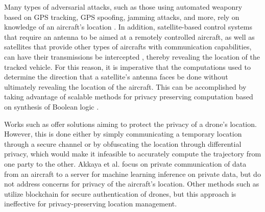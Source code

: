 \documentclass[9pt,sigconf,screen]{acmart}
\newcommand{\yaman}[1]{\textcolor{blue}{{\sf (YJ:} {\sl{#1})}}}
\newcommand{\nasimeh}[1]{\textcolor{purple}{{\sf (NH:} {\sl{#1})}}}
\begin{document}
Many types of adversarial attacks, such as those using automated weaponry based on GPS tracking, GPS spoofing, jamming attacks, and more, rely on knowledge of an aircraft's location \cite{GPSNav}. 
In addition, satellite-based control systems that require an antenna to be aimed at a remotely controlled aircraft, as well as satellites that provide other types of aircrafts with communication capabilities, can have their transmissions be intercepted \cite{interceptComm}, thereby revealing the location of the tracked vehicle. For this reason, it is imperative that the computations used to determine the direction that a satellite's antenna faces be done without ultimately revealing the location of the aircraft. This can be accomplished by taking advantage of scalable methods for privacy preserving computation based on synthesis of Boolean logic \cite{tg}.


Works such as \cite{PPCA, hideAndSeek} offer solutions aiming to protect the privacy of a drone's location. However, this is done either by simply communicating a temporary location through a secure channel or by obfuscating the location through differential privacy, which would make it infeasible to accurately compute the trajectory from one party to the other. Akkaya et al. \cite{Akkaya} focus on private communication of data from an aircraft to a server for machine learning inference on private data, but do not address concerns for privacy of the aircraft's location. Other methods such as \cite{blockchain3} utilize blockchain for secure authentication of drones, but this approach is ineffective for privacy-preserving location management. 
\end{document}

